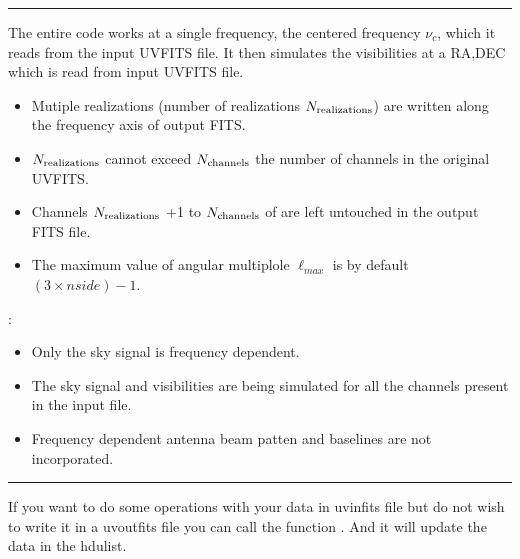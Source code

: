 \documentclass[a4paper,11pt,oneside,english,openany]{sphinxmanual}
\begin{document}
\bigskip\hrule\bigskip


\sphinxAtStartPar
{}

\sphinxAtStartPar
The entire code works at a single frequency, the centered frequency \(\nu_c\), which it reads from the input UVFITS file. It then simulates the visibilities at a RA,DEC which is read from input UVFITS file.
\begin{itemize}
\item {} 
\sphinxAtStartPar
Mutiple realizations (number of realizations \(N_{\rm realizations}\)) are written along the frequency axis of output FITS.

\item {} 
\sphinxAtStartPar
\(N_{\rm realizations}\) cannot exceed \(N_{\rm channels}\) the number of channels in the original UVFITS.

\item {} 
\sphinxAtStartPar
Channels \(N_{\rm realizations}\) +1 to \(N_{\rm channels}\) of are left untouched in the output FITS file.

\item {} 
\sphinxAtStartPar
The maximum value of angular multiplole \(\ell_{max}\) is by default \((3\times nside)-1\).

\end{itemize}

\newpage

\sphinxAtStartPar
{}:
\begin{itemize}
\item {} 
\sphinxAtStartPar
Only the sky signal is frequency dependent.

\item {} 
\sphinxAtStartPar
The sky signal and visibilities are being simulated for all the channels present in the input  file.

\item {} 
\sphinxAtStartPar
Frequency dependent antenna beam patten and baselines are not incorporated.

\end{itemize}


\bigskip\hrule\bigskip


\sphinxAtStartPar
If you want to do some operations with your data in uvinfits file but do not wish to write it in a uvoutfits file you can call the function . And it will update the data in the hdulist.
\end{document}
